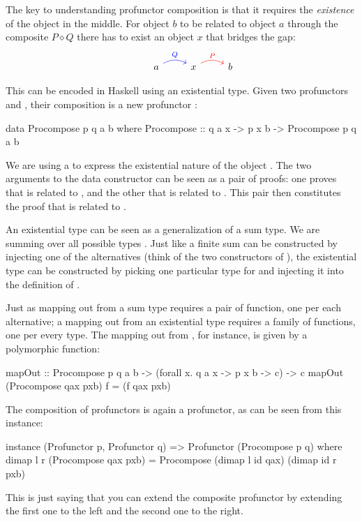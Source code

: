 \documentclass[DaoFP]{subfiles}
\begin{document}
The key to understanding profunctor composition is that it requires the \emph{existence} of the object in the middle. For object $b$ to be related to object $a$ through the composite $P \diamond Q$ there has to exist an object $x$ that bridges the gap:
\[
 \begin{tikzcd}
  & a
  \arrow[r, bend left, blue, "Q"]
 & x
  \arrow[r, bend left, red, "P"]
 & b
  \end{tikzcd}
\]

This can be encoded in Haskell using an existential type. Given two profunctors  and , their composition is a new profunctor :
\begin{haskell}
data Procompose p q a b where
  Procompose ::  q a x -> p x b -> Procompose p q a b
\end{haskell}
We are using a  to express the existential nature of the object . The two arguments to the data constructor can be seen as a pair of proofs: one proves that  is related to , and the other that  is related to . This pair then constitutes the proof that  is related to .

An existential type can be seen as a generalization of a sum type. We are summing over all possible types . Just like a finite sum can be constructed by injecting one of the alternatives (think of the two constructors of ), the existential type can be constructed by picking one particular type for  and injecting it into the definition of . 

Just as mapping out from a sum type requires a pair of function, one per each alternative; a mapping out from an existential type requires a family of functions, one per every type. The mapping out from , for instance, is given by a polymorphic function:
\begin{haskell}
mapOut :: Procompose p q a b -> (forall x. q a x -> p x b -> c) -> c
mapOut (Procompose qax pxb) f = (f qax pxb)
\end{haskell}

The composition of profunctors is again a profunctor, as can be seen from this instance:
\begin{haskell}
instance (Profunctor p, Profunctor q) => Profunctor (Procompose p q) 
  where
    dimap l r (Procompose qax pxb) = 
               Procompose (dimap l id qax) (dimap id r pxb)
\end{haskell}
This is just saying that you can extend the composite profunctor by extending the first one to the left and the second one to the right.
\end{document}
